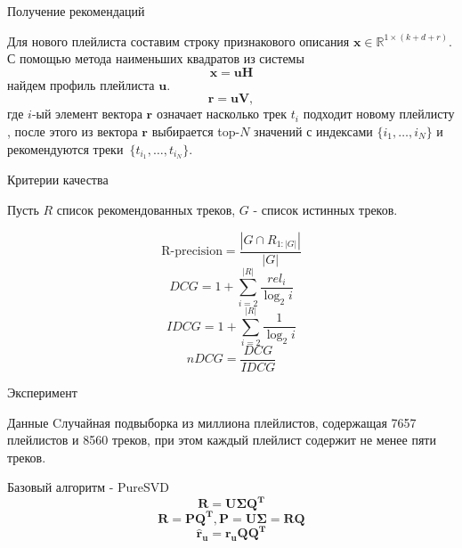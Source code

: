 \documentclass{beamer}
\begin{document}
\begin{frame}{Получение рекомендаций}

Для нового плейлиста составим строку признакового описания $\mathbf{x} \in \mathbb{R}^{1 \times  (k + d + r)}$.  С помощью метода наименьших квадратов из системы \[\mathbf{x} = \mathbf{u}\mathbf{H}\] найдем профиль плейлиста $\mathbf{u}$. \[\mathbf{r} = \mathbf{uV},\] где $i$-ый элемент вектора $\mathbf{r}$ означает насколько трек $t_i$ подходит новому плейлисту , после этого из вектора $\mathbf{r}$ выбирается top-$N$ значений с индексами $\{i_1, \ldots, i_N\}$ и рекомендуются треки~$\{t_{i_1}, \ldots, t_{i_N}\}$.

\end{frame}
\begin{frame}{Критерии качества}

Пусть $R$ список рекомендованных треков, $G$ - список истинных треков.

$$\text{R-precision} = \frac{|G \cap R_{1:|G|}|}{|G|}$$
$$DCG = 1 + \sum_{i = 2}^{|R|} \frac{rel_i}{\log_{2}i}$$
$$IDCG = 1 + \sum_{i = 2}^{|R|} \frac{1}{\log_{2}i}$$
$$nDCG = \frac{DCG}{IDCG}$$

\end{frame}
\begin{frame}{Эксперимент}

\begin{block}{Данные}
Cлучайная подвыборка из миллиона плейлистов, содержащая 7657 плейлистов и 8560 треков, при этом каждый плейлист содержит не менее пяти треков. 
\end{block}

\begin{block}{Базовый алгоритм - PureSVD}
$$\mathbf{R} = \mathbf{U\Sigma Q^T}$$
$$\mathbf{R} = \mathbf{PQ^T},  \mathbf{P} = \mathbf{U\Sigma} = \mathbf{RQ}$$
$$\mathbf{\hat{r}_u} = \mathbf{r_uQQ^T}$$
\end{block}

\end{frame}
\end{document}
